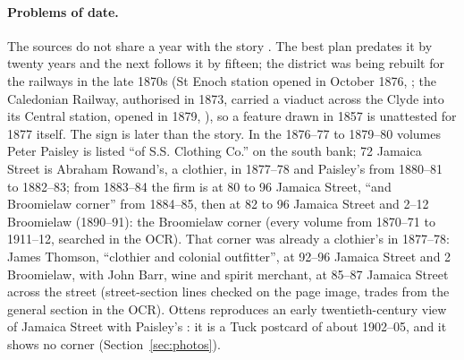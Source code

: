 \documentclass[10pt,a4paper]{article}
\begin{document}
\paragraph{Problems of date.} The sources do not share a year with the story \citep{plewe2002uncertainty}. The best plan predates it by twenty years and the next follows it by fifteen; the district was being rebuilt for the railways in the late 1870s (St Enoch station opened in October 1876, \citealp{railscotStEnoch}; the Caledonian Railway, authorised in 1873, carried a viaduct across the Clyde into its Central station, opened in 1879, \citealp{tunnicliffe2026central}), so a feature drawn in 1857 is unattested for 1877 itself. The sign is later than the story. In the 1876--77 to 1879--80 volumes Peter Paisley is listed ``of S.S. Clothing Co.'' on the south bank; 72 Jamaica Street is Abraham Rowand's, a clothier, in 1877--78 and Paisley's from 1880--81 to 1882--83; from 1883--84 the firm is at 80 to 96 Jamaica Street, ``and Broomielaw corner'' from 1884--85, then at 82 to 96 Jamaica Street and 2--12 Broomielaw (1890--91): the Broomielaw corner (every volume from 1870--71 to 1911--12, searched in the OCR). That corner was already a clothier's in 1877--78: James Thomson, ``clothier and colonial outfitter'', at 92--96 Jamaica Street and 2 Broomielaw, with John Barr, wine and spirit merchant, at 85--87 Jamaica Street across the street (street-section lines checked on the page image, trades from the general section in the OCR). Ottens reproduces an early twentieth-century view of Jamaica Street with Paisley's \citep{ottens2020neverwas}: it is a Tuck postcard of about 1902--05, and it shows no corner (Section~\ref{sec:photos}).
\end{document}
